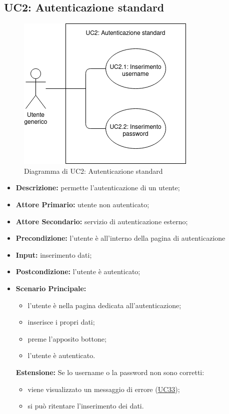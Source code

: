 \subsection{UC2: Autenticazione standard}
\begin{figure}[!ht]
    \caption{Diagramma di UC2: Autenticazione standard}
    \vspace{10px}
    \includegraphics[scale=0.5]{../../../Images/AnalisiRequisiti/UC02}
    \centering
\end{figure}
\label{sec:UC2}
\begin{itemize}
    \item \textbf{Descrizione:} permette l'autenticazione di un utente;
    \item \textbf{Attore Primario:} utente non autenticato;
    \item \textbf{Attore Secondario:} servizio di autenticazione esterno;
    \item \textbf{Precondizione:} l'utente è all'interno della pagina di autenticazione
    \item \textbf{Input:} inserimento dati;
    \item \textbf{Postcondizione:} l'utente è autenticato;
    \item \textbf{Scenario Principale:}
          \begin{itemize}
              \item l'utente è nella pagina dedicata all'autenticazione;
              \item inserisce i propri dati;
              \item preme l'apposito bottone;
              \item l'utente è autenticato.
          \end{itemize}
          \textbf{Estensione:}
          Se lo username o la password non sono corretti:
          \begin{itemize}
              \item viene visualizzato un messaggio di errore (\hyperref[sec:UC33]{\underline{UC33}});
              \item si può ritentare l'inserimento dei dati.
          \end{itemize}
\end{itemize}
